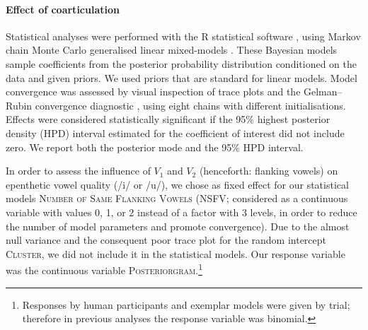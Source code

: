 
\paragraph{Effect of coarticulation}
Statistical analyses were performed with the R statistical software \cite{R-base}, using Markov chain Monte Carlo generalised linear mixed-models \cite{R-MCMCglmm, R-coda}. These Bayesian models sample coefficients from the posterior probability distribution conditioned on the data and given priors. We used priors that are standard for linear models. Model convergence was assessed by visual inspection of trace plots and the Gelman–Rubin convergence diagnostic \cite{gelman1992}, using eight chains with different initialisations. Effects were considered statistically significant if the 95\% highest posterior density (HPD) interval estimated for the coefficient of interest did not include zero. We report both the posterior mode and the 95\% HPD interval.  

In order to assess the influence of $V_{1}$ and $V_{2}$ (henceforth: flanking vowels) on epenthetic vowel quality (/i/ or /u/), we chose as fixed effect for our statistical models \textsc{Number of Same Flanking Vowels} (\textsc{NSFV}; considered as a continuous variable with values 0, 1, or 2 instead of a factor with 3 levels, in order to reduce the number of model parameters and promote convergence). Due to the almost null variance and the consequent poor trace plot for the random intercept \textsc{Cluster}, we did not include it in the statistical models. Our response variable was the continuous variable \textsc{Posteriorgram}.\footnote{Responses by human participants and exemplar models were given by trial; therefore in previous analyses the response variable was binomial.}



